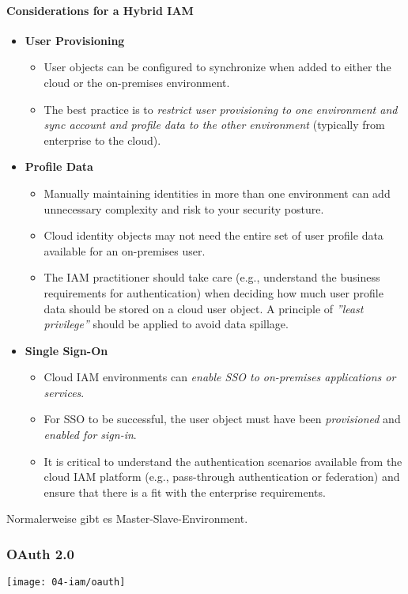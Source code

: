 \paragraph{Considerations for a Hybrid IAM}
\begin{itemize}
    \item \textbf{User Provisioning}
    \begin{itemize}
        \item User objects can be configured to synchronize when added to either the cloud or the on-premises environment.
        \item The best practice is to \textit{restrict user provisioning to one environment and sync account and profile data to the other environment} (typically from enterprise to the cloud).\\
    \end{itemize}
    \item \textbf{Profile Data}
    \begin{itemize}
        \item Manually maintaining identities in more than one environment can add unnecessary complexity and risk to your security posture.
        \item Cloud identity objects may not need the entire set of user profile data available for an on-premises user.
        \item The IAM practitioner should take care (e.g., understand the business requirements for authentication) when deciding how much user profile data should be stored on a cloud user object. A principle of \textit{''least privilege''} should be applied to avoid data spillage.\\
    \end{itemize}
    \item \textbf{Single Sign-On}
    \begin{itemize}
        \item Cloud IAM environments can \textit{enable SSO to on-premises applications or services}.
        \item For SSO to be successful, the user object must have been \textit{provisioned} and \textit{enabled for sign-in}.
        \item It is critical to understand the authentication scenarios available from the cloud IAM platform (e.g., pass-through authentication or federation) and ensure that there is a fit with the enterprise requirements.\\
    \end{itemize}
\end{itemize}

Normalerweise gibt es Master-Slave-Environment.

\subsubsection{OAuth 2.0}
\begin{center}
    \texttt{[image: 04-iam/oauth]}
    \vspace{-8pt}
\end{center}
